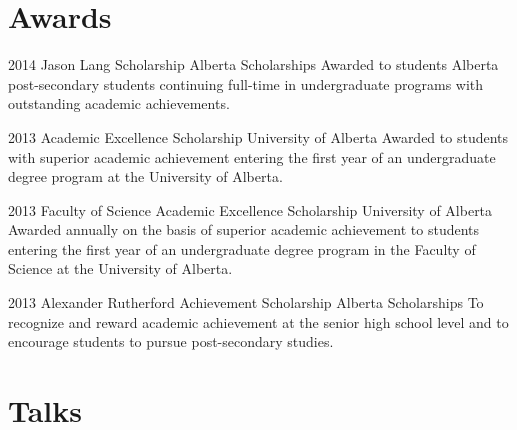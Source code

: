 \documentclass{friggeri-cv} %
\begin{document}
\pagebreak[2]
\section{Awards}

\begin{entrylist}


\entry
{2014}
{Jason Lang Scholarship}
{Alberta Scholarships}
{Awarded to students Alberta post-secondary students continuing full-time in undergraduate programs with outstanding academic achievements.}


\entry
{2013}
{Academic Excellence Scholarship}
{University of Alberta}
{Awarded to students with superior academic achievement entering the first year of an undergraduate degree program at the University of Alberta.}


\entry
{2013}
{Faculty of Science Academic Excellence Scholarship}
{University of Alberta}
{Awarded annually on the basis of superior academic achievement to students entering the first year of an undergraduate degree program in the Faculty of Science at the University of Alberta.}


\entry
{2013}
{Alexander Rutherford Achievement Scholarship}
{Alberta Scholarships}
{To recognize and reward academic achievement at the senior high school level and to encourage students to pursue post-secondary studies.}


\end{entrylist}


\pagebreak[2]
\section{Talks} %
\end{document}
